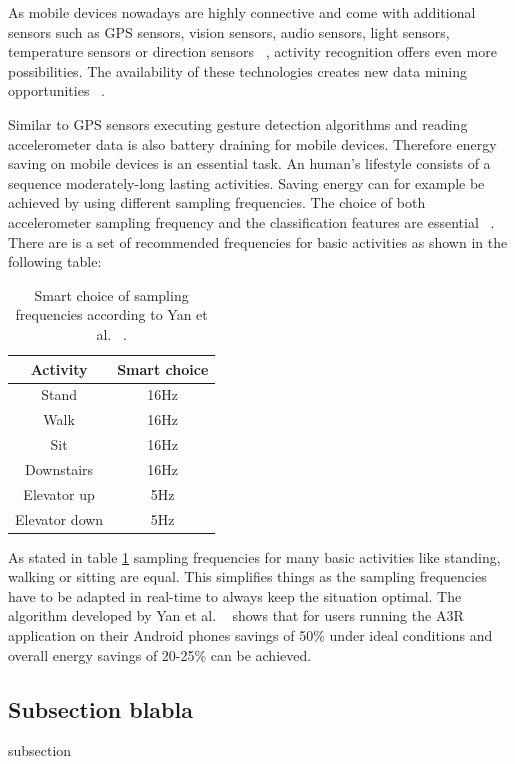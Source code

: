 \documentclass[conference]{IEEEtran}
\begin{document}
As mobile devices nowadays are highly connective and come with additional sensors such as \ac{GPS} sensors, vision sensors, audio sensors, light sensors, temperature sensors or direction sensors ~\cite{Kwapisz2011}, activity recognition offers even more possibilities. The availability of these technologies creates new data mining opportunities ~\cite{Kwapisz2011}.

Similar to \ac{GPS} sensors executing gesture detection algorithms and reading accelerometer data is also battery draining for mobile devices. Therefore energy saving on mobile devices is an essential task. An human's lifestyle consists of a sequence moderately-long lasting activities. Saving energy can for example be achieved by using different sampling frequencies. The choice of both accelerometer sampling frequency and the classification features are essential ~\cite{Yan2012}. There are is a set of recommended frequencies for basic activities as shown in the following table:

\begin{table}
\centering
\begin{tabular}{|c|c|}
\hline
\textbf{Activity} & \textbf{Smart choice} \\
\hline
Stand & 16Hz \\
\hline
Walk & 16Hz \\
\hline
Sit & 16Hz \\
\hline
Downstairs & 16Hz \\
\hline
Elevator up & 5Hz \\
\hline
Elevator down & 5Hz \\
\hline
\end{tabular}
\caption{Smart choice of sampling frequencies according to Yan et al. ~\cite{Yan2012}.}
\label{tab:smartFrequencies}
\end{table}

As stated in table \ref{tab:smartFrequencies} sampling frequencies for many basic activities like standing, walking or sitting are equal. This simplifies things as the sampling frequencies have to be adapted in real-time to always keep the situation optimal.
The algorithm developed by Yan et al. ~\cite{Yan2012} shows that for users running
the A3R application on their Android phones savings of 50\% under ideal conditions and overall energy savings of 20-25\% can be achieved.

\subsection{Subsection blabla}
subsection
\newpage
\end{document}
